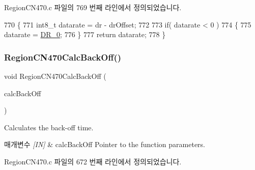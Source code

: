 Region\+C\+N470.\+c 파일의 769 번째 라인에서 정의되었습니다.


\begin{DoxyCode}
770 \{
771     int8\_t datarate = dr - drOffset;
772 
773     \textcolor{keywordflow}{if}( datarate < 0 )
774     \{
775         datarate = \mbox{\hyperlink{group___r_e_g_i_o_n_ga6c4ef966b4f3d5eb7597b087f2b97095}{DR\_0}};
776     \}
777     \textcolor{keywordflow}{return} datarate;
778 \}
\end{DoxyCode}
\mbox{\label{group___r_e_g_i_o_n_c_n470_ga2020e2db0351b7010e2e5fd53c466cc2}} 
\subsubsection{\texorpdfstring{Region\+C\+N470\+Calc\+Back\+Off()}{RegionCN470CalcBackOff()}}
{\footnotesize\ttfamily void Region\+C\+N470\+Calc\+Back\+Off (\begin{DoxyParamCaption}\item[{\mbox{\hyperlink{group___r_e_g_i_o_n_ga7c5c9a8da174e6679eded8257dc92fd9}{Calc\+Back\+Off\+Params\+\_\+t}} $\ast$}]{calc\+Back\+Off }\end{DoxyParamCaption})}



Calculates the back-\/off time. 


\begin{DoxyParams}{매개변수}
{\em \mbox{[}\+I\+N\mbox{]}} & calc\+Back\+Off Pointer to the function parameters. \\
\hline
\end{DoxyParams}


Region\+C\+N470.\+c 파일의 672 번째 라인에서 정의되었습니다.


